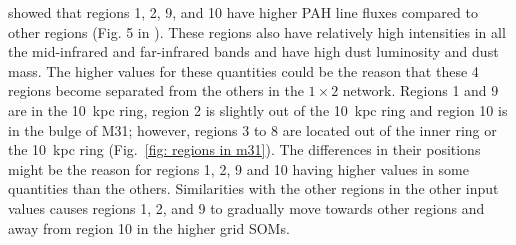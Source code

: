         \cite{Dim15} showed that regions 1, 2, 9, and 10 have higher PAH line fluxes compared to other regions (Fig. 5 in \cite{Dim15}). 
        These regions also have relatively high intensities in all the mid-infrared and far-infrared bands and have high dust luminosity and dust mass.
        The higher values for these quantities could be the reason that these 4 regions become separated from the others in the $1\times2$ network.
        Regions 1 and 9 are in the 10~kpc ring, region 2 is slightly out of the 10~kpc ring and region 10 is in the bulge of M31; however, regions 3 to 8 are located out of the inner ring or the 10~kpc ring (Fig.~\ref{fig: regions in m31}).   
        The differences in their positions might be the reason for regions 1, 2, 9 and 10 having higher values in some quantities than the others. 
        Similarities with the other regions in the other input values causes regions 1, 2, and 9 to gradually move towards other regions and away from region 10 in the higher grid SOMs.
        
        
